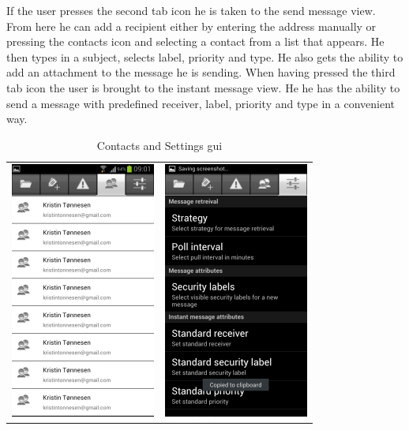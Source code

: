 If the user presses the second tab icon he is taken to the send message view. From here he can add a recipient either by entering the address manually or pressing the contacts icon and selecting a contact from a list that appears. He then types in a subject, selects label, priority and type. He also gets the ability to add an attachment to the message he is sending. 
\newline
\newline
When having pressed the third tab icon the user is brought to the instant message view. He he has the ability to send a message with predefined receiver, label, priority and type in a convenient way.
\newline
\begin{table}[h!]
\begin{center}
\begin{tabular}{cc}
\includegraphics{contacts} & \includegraphics{settingsgui}
\end{tabular}
\end{center}
\caption{Contacts and Settings gui} \label{tab:contactssetingsgui}
\end{table}

